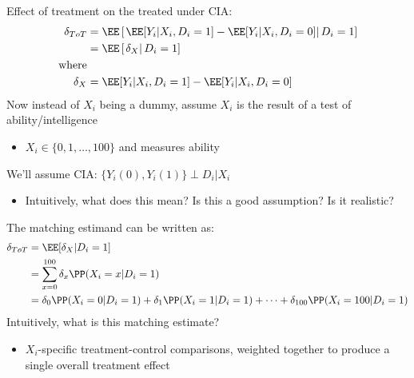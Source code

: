 \documentclass[compress, 8pt]{beamer}
\begin{document}
\begin{frame}{}

Effect of treatment on the treated under CIA: 
\begin{align*}
    \delta_{ToT} &= \EE \left[ \left.
            {\EE [Y_{i} \vert X_i, D_i=1]}
            - {\EE [Y_{i} \vert X_i, D_i=0]}        
            \right\vert D_i = 1
        \right] \\
        &= \EE \left[ \left. 
            \delta_X
        \right\vert D_i = 1\right] \\
    \text{where} & \\
        \delta_X &= {\EE [Y_{i} \vert X_i, D_i=1]}
            - {\EE [Y_{i} \vert X_i, D_i=0]}
\end{align*}
Now instead of $X_i$ being a dummy, assume $X_i$ is the result of a test of ability/intelligence
\begin{itemize}
    \item $X_i \in \{0, 1, \dots, 100\}$ and measures ability
\end{itemize}
We'll assume CIA: $\{Y_i(0), Y_i (1)\} \perp D_i \vert X_i$ 
\begin{itemize}
    \item Intuitively, what does this mean? Is this a good assumption? Is it realistic?
\end{itemize}
The matching estimand can be written as:
\begin{align*}
    \delta_{ToT} %
    &= \EE [\delta_X \vert D_i = 1] \\
    &= \sum_{x=0}^{100} \delta_x \PP(X_i = x \vert D_i = 1 ) \\
    &= \delta_0 \PP (X_i = 0 \vert D_i = 1)
    + \delta_1 \PP (X_i = 1 \vert D_i = 1)
    + \dots + \delta_{100} \PP (X_i = 100 \vert D_i = 1)
\end{align*}
Intuitively, what is this matching estimate?
\begin{itemize}
    \item $X_i$-specific treatment-control comparisons, weighted together to produce a single overall treatment effect
\end{itemize}

\end{frame}
\end{document}
